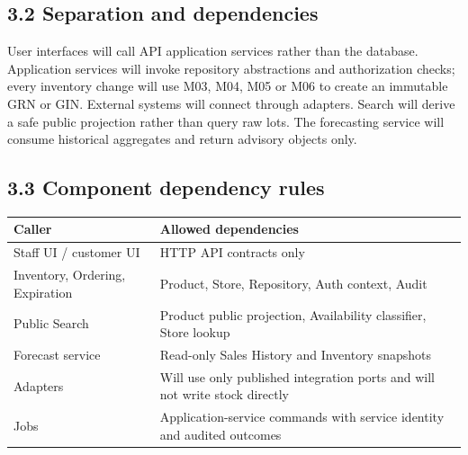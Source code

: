 \subsection{3.2 Separation and dependencies}\label{separation-and-dependencies}

User interfaces will call API application services rather than the database. Application services will invoke repository abstractions and authorization checks; every inventory change will use M03, M04, M05 or M06 to create an immutable GRN or GIN. External systems will connect through adapters. Search will derive a safe public projection rather than query raw lots. The forecasting service will consume historical aggregates and return advisory objects only.

\subsection{3.3 Component dependency rules}\label{component-dependency-rules}

{\def\LTcaptype{none} %
\begin{longtable}[]{|
  >{\raggedright\arraybackslash}m{}|
  >{\raggedright\arraybackslash}m{}|}
\hline
\begin{minipage}[c]{\linewidth}\raggedright
\textbf{Caller}
\end{minipage} & \begin{minipage}[c]{\linewidth}\raggedright
\textbf{Allowed dependencies}
\end{minipage} \\
\hline
\endhead

\endlastfoot
Staff UI / customer UI & HTTP API contracts only \\ \hline
Inventory, Ordering, Expiration & Product, Store, Repository, Auth context, Audit \\ \hline
Public Search & Product public projection, Availability classifier, Store lookup \\ \hline
Forecast service & Read-only Sales History and Inventory snapshots \\ \hline
Adapters & Will use only published integration ports and will not write stock directly \\ \hline
Jobs & Application-service commands with service identity and audited outcomes \\ \hline
\end{longtable}
}

